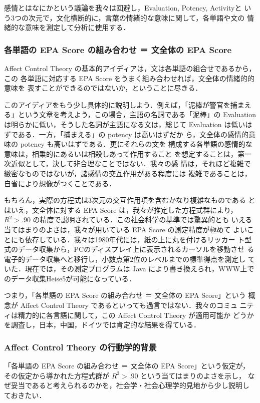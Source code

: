 \documentclass[japanese]{jnlp_1.3d}
\newcommand{\citep}{}
\begin{document}
感情とはなにかという議論を我々は回避し，Evaluation, Potency, Activityと
いう3つの次元で，文化横断的に，言葉の情緒的な意味に関して，各単語や文の
情緒的な意味を測定して分析に使用する．


\subsubsection{各単語の EPA Score の組み合わせ ＝ 文全体の EPA Score}
Affect Control Theory の基本的アイディアは，文は各単語の組合せであるから，この
各単語に対応する EPA Score をうまく組み合わせれば，文全体の情緒的的意味を
表すことができるのではないか，ということに尽きる．

このアイディアをもう少し具体的に説明しよう．例えば，「泥棒が警官を捕まえ
る」という文章を考えよう，この場合，主語の名詞である「泥棒」の
Evaluation は明らかに低い，そうした名詞が主語になる文は，総じて
Evaluation は低いはずである．一方，「捕まえる」の potency は高いはずだか
ら，文全体の感情的意味の potency も高いはずである．更にそれらの文を
構成する各単語の感情的な意味は，相乗的にあるいは相殺しあって作用すること
を想定することは，第一次近似として，決して非合理なことではない．我々の感
情は，それほど複雑で緻密なものではないが，諸感情の交互作用がある程度には
複雑であることは，自省により想像がつくことである．

もちろん，実際の方程式は3次元の交互作用項を含むかなり複雑なものである
とはいえ，文全体に対する EPA Score は，我々が推定した方程式群により，
$R^2 > .90$ の精度で説明されている．この社会科学の基準では驚異的とも
いえる当てはまりのよさは，我々が用いている EPA Score の測定精度が極めて
よいことにも依存している．我々は1980年代には，紙の上に丸を付けるリッカー
ト型式のデータ収集から，PCのディスプレイ上に表示されるカーソルを移動させ
る電子的データ収集へと移行し，小数点第2位のレベルまでの標準得点を測定し
ていた．現在では，その測定プログラムは Java により書き換えられ，WWW上で
のデータ収集\citep{Heise5}が可能になっている．


つまり，「各単語の EPA Score の組み合わせ ＝ 文全体の EPA Score」という
概念が Affect Control Theory であるといっても過言ではない．我々のコミュ
ニティは精力的に各言語に関して，この Affect Control Theory が適用可能か
どうかを調査し，日本，中国，ドイツでは肯定的な結果を得ている．


 
\subsubsection{Affect Control Theory の行動学的背景}
「各単語の EPA Score の組み合わせ ＝ 文全体の EPA Score」という仮定が，
その仮定から導かれた方程式群が $R^2 > .90$ という当てはまりのよさを示し，
なぜ妥当であると考えられるのかを，社会学・社会心理学的見地から少し説明し
ておきたい．
\end{document}
